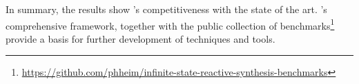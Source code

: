 \begin{figure}[t!]
\hspace{0.025\textwidth}
\begin{minipage}[t]{0.39\textwidth}
\centering
\macrosweapcomp
\vspace{-.2cm}

\label{figure:issy-vs-sweap}
\end{minipage}
\hspace{0.05\textwidth}
\begin{minipage}[t]{0.39\textwidth}
\centering
\centering
\macroissycomp

\vspace{-.2cm}
\label{figure:accel-compare}
\hspace{0.025\textwidth}
\end{minipage}

\end{figure}

In summary,  the results show \issy's competitiveness with the state of the art. \issy's comprehensive framework, together with the public collection of benchmarks\footnote{\url{https://github.com/phheim/infinite-state-reactive-synthesis-benchmarks}} provide a basis for further development of techniques and tools.
